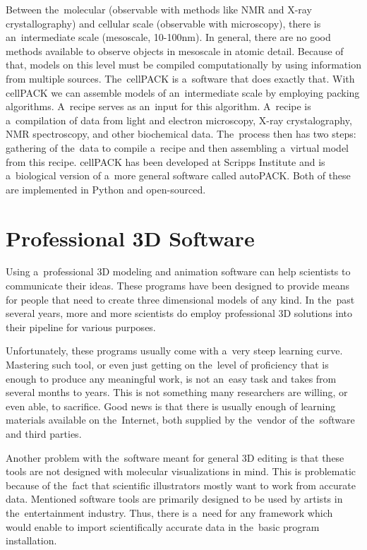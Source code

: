 \documentclass[
  digital, %
  table,   %
  nolof,     %
  nolot,     %
  oneside,
]{fithesis3}
\begin{document}
Between the molecular (observable with methods like NMR and X-ray crystallography) and cellular scale (observable with microscopy), there is an intermediate scale (mesoscale, 10-100nm). In general, there are no good methods available to observe objects in mesoscale in atomic detail. Because of that, models on this level must be compiled computationally by using information from multiple sources. The cellPACK \cite{cellPACK} is a software that does exactly that. With cellPACK we can assemble models of an intermediate scale by employing packing algorithms. A recipe serves as an input for this algorithm. A recipe is a compilation of data from light and electron microscopy, X-ray crystalography, NMR spectroscopy, and other biochemical data. The process then has two steps: gathering of the data to compile a recipe and then assembling a virtual model from this recipe. cellPACK has been developed at Scripps Institute and is a biological version of a more general software called autoPACK. Both of these are implemented in Python and open-sourced.

\section{Professional 3D Software}
Using a professional 3D modeling and animation software can help scientists to communicate their ideas. These programs have been designed to provide means for people that need to create three dimensional models of any kind. In the past several years, more and more scientists do employ professional 3D solutions into their pipeline for various purposes.

Unfortunately, these programs usually come with a very steep learning curve. Mastering such tool, or even just getting on the level of proficiency that is enough to produce any meaningful work, is not an easy task and takes from several months to years. This is not something many researchers are willing, or even able, to sacrifice. Good news is that there is usually enough of learning materials available on the Internet, both supplied by the vendor of the software and third parties.

Another problem with the software meant for general 3D editing is that these tools are not designed with molecular visualizations in mind. This is problematic because of the fact that scientific illustrators mostly want to work from accurate data. Mentioned software tools are primarily designed to be used by artists in the entertainment industry. Thus, there is a need for any framework which would enable to import scientifically accurate data in the basic program installation.
\end{document}

